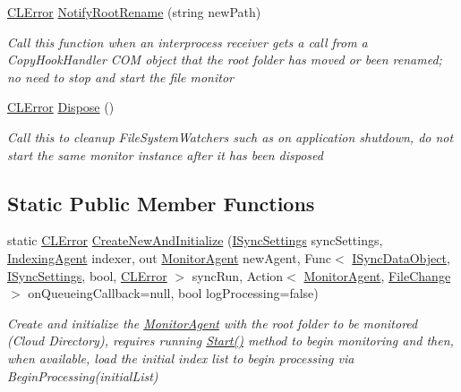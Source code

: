 \begin{DoxyCompactItemize}
\hyperlink{class_cloud_api_public_1_1_model_1_1_c_l_error}{C\-L\-Error} \hyperlink{class_file_monitor_1_1_monitor_agent_a724124fa6c393e5c617aa07afea9f7fc}{Notify\-Root\-Rename} (string new\-Path)
\begin{DoxyCompactList}\small\item\em Call this function when an interprocess receiver gets a call from a Copy\-Hook\-Handler C\-O\-M object that the root folder has moved or been renamed; no need to stop and start the file monitor \end{DoxyCompactList}\item 
\hyperlink{class_cloud_api_public_1_1_model_1_1_c_l_error}{C\-L\-Error} \hyperlink{class_file_monitor_1_1_monitor_agent_af1d59a6daa20f37ff4746eaa14f17e6f}{Dispose} ()
\begin{DoxyCompactList}\small\item\em Call this to cleanup File\-System\-Watchers such as on application shutdown, do not start the same monitor instance after it has been disposed \end{DoxyCompactList}\end{DoxyCompactItemize}
\subsection*{Static Public Member Functions}
\begin{DoxyCompactItemize}
\item 
static \hyperlink{class_cloud_api_public_1_1_model_1_1_c_l_error}{C\-L\-Error} \hyperlink{class_file_monitor_1_1_monitor_agent_a1684faf7b2eeb0d84f7f500c6d309487}{Create\-New\-And\-Initialize} (\hyperlink{interface_cloud_api_public_1_1_interfaces_1_1_i_sync_settings}{I\-Sync\-Settings} sync\-Settings, \hyperlink{class_s_q_l_indexer_1_1_indexing_agent}{Indexing\-Agent} indexer, out \hyperlink{class_file_monitor_1_1_monitor_agent}{Monitor\-Agent} new\-Agent, Func$<$ \hyperlink{interface_cloud_api_public_1_1_interfaces_1_1_i_sync_data_object}{I\-Sync\-Data\-Object}, \hyperlink{interface_cloud_api_public_1_1_interfaces_1_1_i_sync_settings}{I\-Sync\-Settings}, bool, \hyperlink{class_cloud_api_public_1_1_model_1_1_c_l_error}{C\-L\-Error} $>$ sync\-Run, Action$<$ \hyperlink{class_file_monitor_1_1_monitor_agent}{Monitor\-Agent}, \hyperlink{class_cloud_api_public_1_1_model_1_1_file_change}{File\-Change} $>$ on\-Queueing\-Callback=null, bool log\-Processing=false)
\begin{DoxyCompactList}\small\item\em Create and initialize the \hyperlink{class_file_monitor_1_1_monitor_agent}{Monitor\-Agent} with the root folder to be monitored (Cloud Directory), requires running \hyperlink{class_file_monitor_1_1_monitor_agent_a1fc5bca23e82e87243e4e64743b8cd6d}{Start()} method to begin monitoring and then, when available, load the initial index list to begin processing via Begin\-Processing(initial\-List) \end{DoxyCompactList}\end{DoxyCompactItemize}


